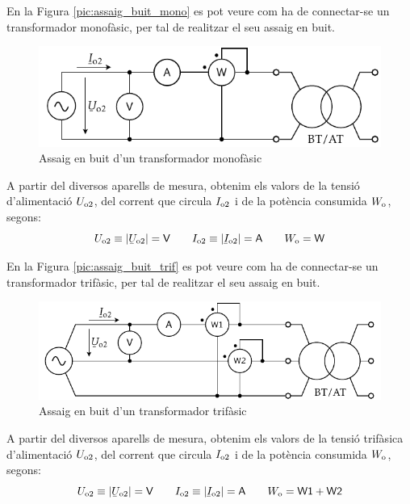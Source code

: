 En la Figura \vref{pic:assaig_buit_mono} es pot veure com ha de
connectar-se un transformador monof\`{a}sic, per tal de realitzar el seu
assaig en buit.

\begin{figure}[htb]
\centering
    \includegraphics{Imatges/Cap-TrafosPot-Assaig-Buit-Monofasic.pdf}
\caption{Assaig en buit d'un transformador monof\`{a}sic}
\label{pic:assaig_buit_mono}
\end{figure}

A partir del diversos aparells de mesura, obtenim els valors de la
tensi\'{o} d'alimentaci\'{o} $U_\mathrm{o2}$, del corrent que circula
$I_\mathrm{o2}$ i de la pot\`{e}ncia consumida $W_\mathrm{o}$, segons:
\begin{equation}
    U\ped{o2}\equiv|\cmplx{U}\ped{o2}|=\textsf{V} \qquad
    I\ped{o2}\equiv|\cmplx{I}\ped{o2}|=\textsf{A}
    \qquad W\ped{o}=\textsf{W}
\end{equation}

En la Figura \vref{pic:assaig_buit_trif} es pot veure com ha de
connectar-se un transformador trif\`{a}sic, per tal de realitzar el seu
assaig en buit.

\begin{figure}[h]
\centering
    \includegraphics{Imatges/Cap-TrafosPot-Assaig-Buit-Trifasic.pdf}
\caption{Assaig en buit d'un transformador trif\`{a}sic}
\label{pic:assaig_buit_trif}
\end{figure}


A partir del diversos aparells de mesura, obtenim els valors de la
tensi\'{o} trif\`{a}sica d'alimentaci\'{o} $U_\mathrm{o2}$, del corrent que circula
$I_\mathrm{o2}$ i de la pot\`{e}ncia consumida $W_\mathrm{o}$, segons:
\begin{equation}
    U\ped{o2}\equiv|\cmplx{U}\ped{o2}|=\textsf{V} \qquad
    I\ped{o2}\equiv|\cmplx{I}\ped{o2}|=\textsf{A} \qquad
    W\ped{o}=\textsf{W1}+\textsf{W2}
\end{equation}

